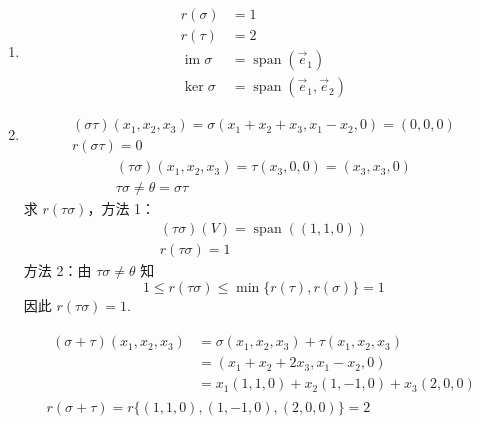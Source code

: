 \documentclass[UTF8,12pt,a4paper,fontset=fandol]{ctexart}
\begin{document}
\begin{solve}
\begin{enumerate}
                \item \begin{align*}
                          r(\sigma)   & = 1                          \\
                          r(\tau)     & = 2                          \\
                          \operatorname{im} \sigma  & = \operatorname{span}(\vec{e}_1)            \\
                          \ker \sigma & = \operatorname{span}(\vec{e}_1, \vec{e}_2)
                      \end{align*}

                \item \begin{gather*}
                          (\sigma \tau)(x_1, x_2, x_3) = \sigma(x_1 + x_2 + x_3, x_1 - x_2, 0) = (0, 0, 0) \\
                          r(\sigma \tau) = 0
                      \end{gather*}
                      \begin{gather*}
                          (\tau \sigma)(x_1, x_2, x_3) = \tau(x_3, 0, 0) = (x_3, x_3, 0) \\
                          \tau \sigma \neq \theta = \sigma \tau
                      \end{gather*}
                      求 $ r(\tau \sigma) $，方法 1：
                      \begin{gather*}
                          (\tau \sigma)(V) = \operatorname{span}((1, 1, 0)) \\
                          r(\tau \sigma) = 1
                      \end{gather*}
                      方法 2：由 $ \tau \sigma \neq \theta $ 知
                      \[ 1 \leqslant r(\tau \sigma) \leqslant \min\{r(\tau), r(\sigma)\} = 1 \]
                      因此 $ r(\tau \sigma) = 1 $.

                      \begin{gather*}
                          \begin{aligned}
                              (\sigma + \tau)(x_1, x_2, x_3) & = \sigma(x_1, x_2, x_3) + \tau(x_1, x_2, x_3) \\
                                                             & = (x_1 + x_2 + 2 x_3, x_1 - x_2, 0)           \\
                                                             & = x_1(1, 1, 0) + x_2(1, -1, 0) + x_3(2, 0, 0)
                          \end{aligned} \\
                          r(\sigma + \tau) = r\{(1, 1, 0), (1, -1, 0), (2, 0, 0)\} = 2
                      \end{gather*}


\end{enumerate}
\end{solve}
\end{document}
